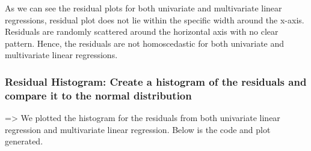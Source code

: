 \documentclass[11pt]{article}
\begin{document}
As we can see the residual plots for both univariate and multivariate
linear regressions, residual plot does not lie within the specific width
around the x-axis. Residuals are randomly scattered around the
horizontal axis with no clear pattern. Hence, the residuals are not
homoscedastic for both univariate and multivariate linear regressions.

    \hypertarget{residual-histogram-create-a-histogram-of-the-residuals-and-compare-it-to-the-normal-distribution}{%
\subsubsection{Residual Histogram: Create a histogram of the residuals
and compare it to the normal
distribution}\label{residual-histogram-create-a-histogram-of-the-residuals-and-compare-it-to-the-normal-distribution}}

=\textgreater{} We plotted the histogram for the residuals from both
univariate linear regression and multivariate linear regression. Below
is the code and plot generated.
\end{document}
